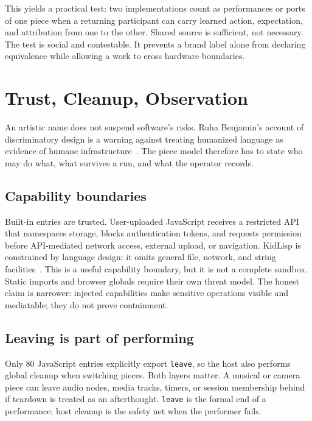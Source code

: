 \documentclass[10pt,letterpaper,twocolumn]{article}
\newcommand{\code}[1]{\texttt{#1}}
\begin{document}
This yields a practical test: two implementations count as performances or ports of one piece when a returning participant can carry learned action, expectation, and attribution from one to the other. Shared source is sufficient, not necessary. The test is social and contestable. It prevents a brand label alone from declaring equivalence while allowing a work to cross hardware boundaries.

\section{Trust, Cleanup, Observation}

An artistic name does not suspend software's risks. Ruha Benjamin's account of discriminatory design is a warning against treating humanized language as evidence of humane infrastructure~\citep{benjamin2019race}. The piece model therefore has to state who may do what, what survives a run, and what the operator records.

\subsection{Capability boundaries}

Built-in entries are trusted. User-uploaded JavaScript receives a restricted API that namespaces storage, blocks authentication tokens, and requests permission before API-mediated network access, external upload, or navigation. KidLisp is constrained by language design: it omits general file, network, and string facilities~\citep{scudder2026kidlisp}. This is a useful capability boundary, but it is not a complete sandbox. Static imports and browser globals require their own threat model. The honest claim is narrower: injected capabilities make sensitive operations visible and mediatable; they do not prove containment.

\subsection{Leaving is part of performing}

Only 80 JavaScript entries explicitly export \code{leave}, so the host also performs global cleanup when switching pieces. Both layers matter. A musical or camera piece can leave audio nodes, media tracks, timers, or session membership behind if teardown is treated as an afterthought. \code{leave} is the formal end of a performance; host cleanup is the safety net when the performer fails.
\end{document}
